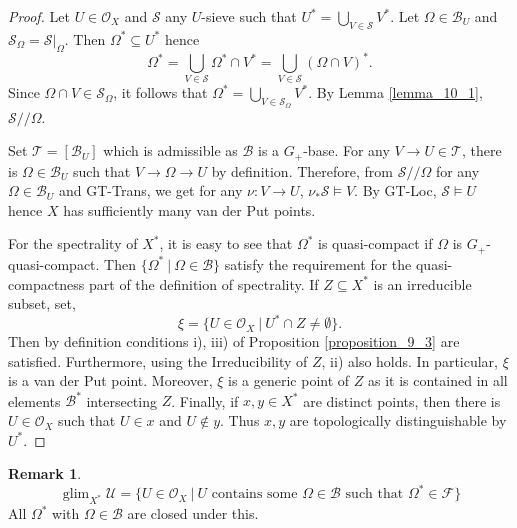 \documentclass[10pt]{article}
\numberwithin{equation}{section}
\theoremstyle{definition}
\newtheorem{remark}{Remark}[subsection]
\DeclareMathOperator{\glim}{glim}
\newcommand{\Ouv}{\mathscr{O}}
\newcommand{\U}[0]{\mathcal{U}}
\newcommand{\sep}[0]{\:|\:}
\newcommand{\sS}[0]{\mathscr{S}}
\newcommand{\sT}[0]{\mathscr{T}}
\newcommand{\cB}[0]{\mathcal{B}}
\begin{document}
\begin{proof}
    Let $U\in\Ouv_X$ and $\sS$ any $U$-sieve such that $U^* = \bigcup_{V\in\sS}V^*$. Let $\Omega\in\cB_U$ and $\sS_\Omega = \sS|_\Omega$. Then $\Omega^*\subseteq U^*$ hence
    \begin{equation*}
        \Omega^*=\bigcup_{V\in\sS}\Omega^*\cap V^*=\bigcup_{V\in\sS}(\Omega\cap V)^*.
    \end{equation*}
    Since $\Omega\cap V\in\sS_\Omega$, it follows that $\Omega^* = \bigcup_{V\in\sS_\Omega}V^*$. By Lemma \ref{lemma_10_1}, $\sS// \Omega$.
    \par Set $\sT = [\cB_U]$ which is admissible as $\cB$ is a $G_+$-base. For any $V\to U\in\sT$, there is $\Omega\in\cB_U$ such that $V\to \Omega\to U$ by definition. Therefore, from $\sS//\Omega$ for any $\Omega\in\cB_U$ and GT-Trans, we get for any $\nu:V\to U$, $\nu_*\sS \vDash V$. By GT-Loc, $\sS\vDash U$ hence $X$ has sufficiently many van der Put points.
    \par For the spectrality of $X^*$, it is easy to see that $\Omega^*$ is quasi-compact if $\Omega$ is $G_+$-quasi-compact. Then $\{\Omega^*\sep \Omega\in\cB\}$ satisfy the requirement for the quasi-compactness part of the definition of spectrality. If $Z\subseteq X^*$ is an irreducible subset, set,
    \begin{equation*}
        \xi=\{U\in\Ouv_X\sep U^*\cap Z\not=\emptyset\}.
    \end{equation*}
    Then by definition conditions i), iii) of Proposition \ref{proposition_9_3} are satisfied. Furthermore, using the Irreducibility of $Z$, ii) also holds. In particular, $\xi$ is a van der Put point. Moreover, $\xi$ is a generic point of $Z$ as it is contained in all elements $\cB^*$ intersecting $Z$.
    Finally, if $x,y\in X^*$ are distinct points, then there is $U\in\Ouv_X$ such that $U\in x$ and $U\not\in y$. Thus $x,y$ are topologically distinguishable by $U^*$.
\end{proof}

\begin{remark}
    \begin{equation*}
        \glim_{X^*}\U = \{U\in\Ouv_X\sep \text{$U$ contains some $\Omega\in\cB$ such that $\Omega^*\in\mathcal{F}$}\}
    \end{equation*}
    All $\Omega^*$ with $\Omega\in\cB$ are closed under this.
\end{remark}
\end{document}
